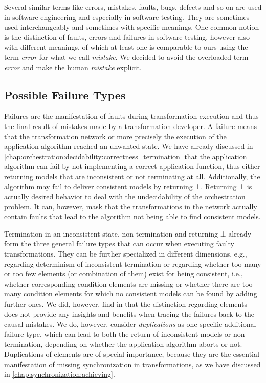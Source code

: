 Several similar terms like errors, mistakes, faults, bugs, defects and so on are used in software engineering and especially in software testing.
They are sometimes used interchangeably and sometimes with specific meanings.
One common notion is the distinction of faults, errors and failures in software testing, however also with different meanings, of which at least one is comparable to ours using the term \emph{error} for what we call \emph{mistake}.
We decided to avoid the overloaded term \emph{error} and make the human \emph{mistake} explicit.


\subsection{Possible Failure Types}
\label{chap:errors:categorization:failures}

Failures are the manifestation of faults during transformation execution and thus the final result of mistakes made by a transformation developer.
A failure means that the transformation network or more precisely the execution of the application algorithm reached an unwanted state.
We have already discussed in \autoref{chap:orchestration:decidability:correctness_termination} that the application algorithm can fail by not implementing a correct application function, thus either returning models that are inconsistent or not terminating at all.
Additionally, the algorithm may fail to deliver consistent models by returning $\bot$.
Returning $\bot$ is actually desired behavior to deal with the undecidability of the orchestration problem.
It can, however, mask that the transformations in the network actually contain faults that lead to the algorithm not being able to find consistent models.

Termination in an inconsistent state, non-termination and returning $\bot$ already form the three general failure types that can occur when executing faulty transformations.
They can be further specialized in different dimensions, e.g., regarding determinism of inconsistent termination or regarding whether too many or too few elements (or combination of them) exist for being consistent, i.e., whether corresponding condition elements are missing or whether there are too many condition elements for which no consistent models can be found by adding further ones.
We did, however, find in \cite[Table~5.7]{saglam2020ma} that the distinction regarding elements does not provide any insights and benefits when tracing the failures back to the causal mistakes.
We do, however, consider \emph{duplications} as one specific additional failure type, which can lead to both the return of inconsistent models or non-termination, depending on whether the application algorithm aborts or not.
Duplications of elements are of special importance, because they are the essential manifestation of missing synchronization in transformations, as we have discussed in \autoref{chap:synchronization:achieving}.

